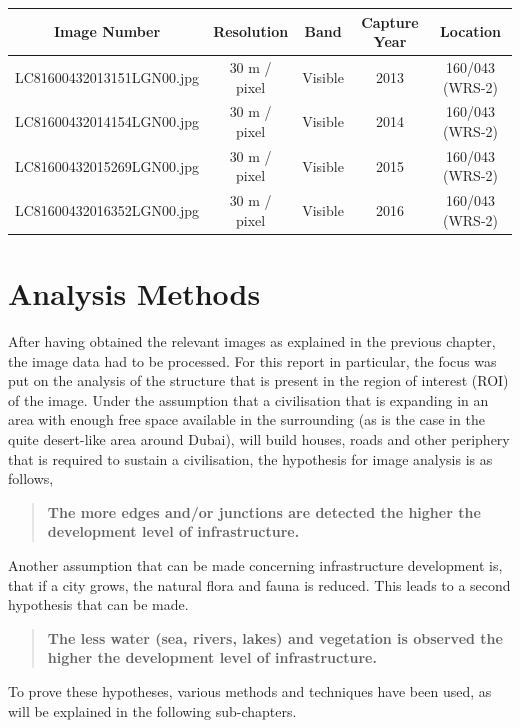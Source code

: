 \begin{table} [h!]
	\centering
	\begin{tabular}{| c | c | c | c | c |}
	\hline
	\textbf{Image Number} & \textbf{Resolution} & \textbf{Band} & \textbf{Capture Year} & \textbf{Location} \\ \hline
	LC81600432013151LGN00.jpg & 30 m / pixel& Visible & 2013 & 160/043 (WRS-2) \\ \hline 
	LC81600432014154LGN00.jpg & 30 m / pixel& Visible & 2014 & 160/043 (WRS-2) \\ \hline 
	LC81600432015269LGN00.jpg & 30 m / pixel& Visible & 2015 & 160/043 (WRS-2) \\ \hline 
	LC81600432016352LGN00.jpg & 30 m / pixel& Visible & 2016 & 160/043 (WRS-2) \\ \hline 
	\end{tabular}
\end{table}

\section{Analysis Methods}
After having obtained the relevant images as explained in the previous chapter, the image data had to be processed. For this report in particular, the focus was put on the analysis of the structure that is present in the region of interest (ROI) of the image. Under the assumption that a civilisation that is expanding in an area with enough free space available in the surrounding (as is the case in the quite desert-like area around Dubai), will build houses, roads and other periphery that is required to sustain a civilisation, the hypothesis for image analysis is as follows,\\
\begin{quote}
	\textbf{The more edges and/or junctions are detected the higher the development level of infrastructure.}
\end{quote}

Another assumption that can be made concerning infrastructure development is, that if a city grows, the natural flora and fauna is reduced. This leads to a second hypothesis that can be made.
\begin{quote}
	\textbf{The less water (sea, rivers, lakes) and vegetation is observed the higher the development level of infrastructure.}
\end{quote}

To prove these hypotheses, various methods and techniques have been used, as will be explained in the following sub-chapters.


